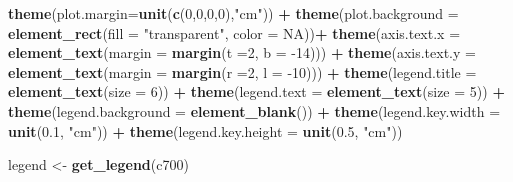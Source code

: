 \documentclass[12pt,oneside]{reedthesis}
\newenvironment{Shaded}{\begin{snugshade}}{\end{snugshade}}
\newcommand{\DataTypeTok}[1]{\textcolor[rgb]{0.13,0.29,0.53}{#1}}
\newcommand{\DecValTok}[1]{\textcolor[rgb]{0.00,0.00,0.81}{#1}}
\newcommand{\FloatTok}[1]{\textcolor[rgb]{0.00,0.00,0.81}{#1}}
\newcommand{\KeywordTok}[1]{\textcolor[rgb]{0.13,0.29,0.53}{\textbf{#1}}}
\newcommand{\NormalTok}[1]{#1}
\newcommand{\OperatorTok}[1]{\textcolor[rgb]{0.81,0.36,0.00}{\textbf{#1}}}
\newcommand{\OtherTok}[1]{\textcolor[rgb]{0.56,0.35,0.01}{#1}}
\newcommand{\StringTok}[1]{\textcolor[rgb]{0.31,0.60,0.02}{#1}}
\begin{document}
\begin{Shaded}
\begin{Highlighting}[]
\StringTok{  }\KeywordTok{theme}\NormalTok{(}\DataTypeTok{plot.margin=}\KeywordTok{unit}\NormalTok{(}\KeywordTok{c}\NormalTok{(}\DecValTok{0}\NormalTok{,}\DecValTok{0}\NormalTok{,}\DecValTok{0}\NormalTok{,}\DecValTok{0}\NormalTok{),}\StringTok{"cm"}\NormalTok{)) }\OperatorTok{+}
\StringTok{  }\KeywordTok{theme}\NormalTok{(}\DataTypeTok{plot.background =} \KeywordTok{element_rect}\NormalTok{(}\DataTypeTok{fill =} \StringTok{"transparent"}\NormalTok{, }\DataTypeTok{color =} \OtherTok{NA}\NormalTok{))}\OperatorTok{+}
\StringTok{  }\KeywordTok{theme}\NormalTok{(}\DataTypeTok{axis.text.x =} \KeywordTok{element_text}\NormalTok{(}\DataTypeTok{margin =}  \KeywordTok{margin}\NormalTok{(}\DataTypeTok{t =}\DecValTok{2}\NormalTok{, }\DataTypeTok{b =} \DecValTok{-14}\NormalTok{))) }\OperatorTok{+}\StringTok{ }
\StringTok{  }\KeywordTok{theme}\NormalTok{(}\DataTypeTok{axis.text.y =} \KeywordTok{element_text}\NormalTok{(}\DataTypeTok{margin =}  \KeywordTok{margin}\NormalTok{(}\DataTypeTok{r =}\DecValTok{2}\NormalTok{, }\DataTypeTok{l =} \DecValTok{-10}\NormalTok{))) }\OperatorTok{+}
\StringTok{  }\KeywordTok{theme}\NormalTok{(}\DataTypeTok{legend.title =} \KeywordTok{element_text}\NormalTok{(}\DataTypeTok{size =} \DecValTok{6}\NormalTok{)) }\OperatorTok{+}
\StringTok{  }\KeywordTok{theme}\NormalTok{(}\DataTypeTok{legend.text =} \KeywordTok{element_text}\NormalTok{(}\DataTypeTok{size =} \DecValTok{5}\NormalTok{)) }\OperatorTok{+}\StringTok{ }
\StringTok{  }\KeywordTok{theme}\NormalTok{(}\DataTypeTok{legend.background =} \KeywordTok{element_blank}\NormalTok{()) }\OperatorTok{+}
\StringTok{  }\KeywordTok{theme}\NormalTok{(}\DataTypeTok{legend.key.width =} \KeywordTok{unit}\NormalTok{(}\FloatTok{0.1}\NormalTok{, }\StringTok{"cm"}\NormalTok{)) }\OperatorTok{+}
\StringTok{  }\KeywordTok{theme}\NormalTok{(}\DataTypeTok{legend.key.height =} \KeywordTok{unit}\NormalTok{(}\FloatTok{0.5}\NormalTok{, }\StringTok{"cm"}\NormalTok{))}

\NormalTok{legend <-}\StringTok{ }\KeywordTok{get_legend}\NormalTok{(c700)}


\end{Highlighting}
\end{Shaded}
\end{document}
